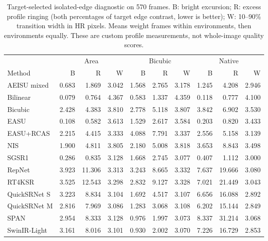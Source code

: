 \begin{table}[t]
\centering\footnotesize
\setlength{\tabcolsep}{4pt}
\caption{Target-selected isolated-edge diagnostic on 570 frames. B: bright excursion; R: excess profile ringing (both percentages of target edge contrast, lower is better); W: 10--90\% transition width in HR pixels. Means weight frames within environments, then environments equally. These are custom profile measurements, not whole-image quality scores.}
\label{tab:edge-profiles}
\begin{tabular}{l*{9}{r}}
\toprule
 & \multicolumn{3}{c}{Area} & \multicolumn{3}{c}{Bicubic} & \multicolumn{3}{c}{Native}\\
\cmidrule(lr){2-4}\cmidrule(lr){5-7}\cmidrule(lr){8-10}
Method & B & R & W & B & R & W & B & R & W\\
\midrule
AEISU mixed & 0.683 & 1.869 & 3.042 & 1.568 & 2.765 & 3.178 & 1.245 & 4.208 & 2.946\\
Bilinear & 0.079 & 0.764 & 4.367 & 0.583 & 1.337 & 4.359 & 0.118 & 0.777 & 4.100\\
Bicubic & 2.428 & 4.383 & 3.810 & 2.778 & 5.118 & 3.807 & 3.842 & 6.902 & 3.530\\
EASU & 0.108 & 0.582 & 3.613 & 1.529 & 2.617 & 3.584 & 0.203 & 0.820 & 3.433\\
EASU+RCAS & 2.215 & 4.415 & 3.333 & 4.088 & 7.791 & 3.337 & 2.556 & 5.158 & 3.139\\
NIS & 1.900 & 4.811 & 3.805 & 2.180 & 5.008 & 3.818 & 3.653 & 8.843 & 3.498\\
SGSR1 & 0.286 & 0.835 & 3.128 & 1.668 & 2.745 & 3.077 & 0.407 & 1.112 & 3.000\\
RepNet & 3.923 & 11.306 & 3.313 & 3.243 & 8.665 & 3.332 & 7.637 & 19.666 & 3.080\\
RT4KSR & 3.525 & 12.543 & 3.298 & 2.832 & 9.127 & 3.328 & 7.021 & 21.449 & 3.043\\
QuickSRNet S & 3.223 & 8.834 & 3.104 & 1.692 & 4.517 & 3.107 & 6.656 & 16.088 & 2.892\\
QuickSRNet M & 2.816 & 7.969 & 3.086 & 1.283 & 3.068 & 3.108 & 6.202 & 15.144 & 2.849\\
SPAN & 2.954 & 8.333 & 3.128 & 0.976 & 1.997 & 3.073 & 8.337 & 31.214 & 3.068\\
SwinIR-Light & 3.161 & 8.016 & 3.101 & 0.930 & 2.002 & 3.070 & 7.226 & 16.729 & 2.853\\
\bottomrule
\end{tabular}
\end{table}
